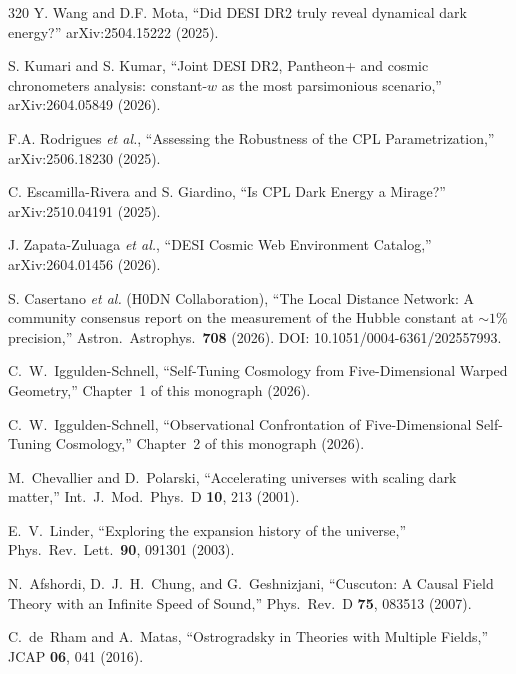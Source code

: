 \begin{thebibliography}{320}
Y. Wang and D.F. Mota,
``Did DESI DR2 truly reveal dynamical dark energy?''
arXiv:2504.15222 (2025).

S. Kumari and S. Kumar,
``Joint DESI DR2, Pantheon+ and cosmic chronometers analysis: constant-$w$ as the most parsimonious scenario,''
arXiv:2604.05849 (2026).

F.A. Rodrigues \textit{et al.},
``Assessing the Robustness of the CPL Parametrization,''
arXiv:2506.18230 (2025).

C. Escamilla-Rivera and S. Giardino,
``Is CPL Dark Energy a Mirage?''
arXiv:2510.04191 (2025).

J. Zapata-Zuluaga \textit{et al.},
``DESI Cosmic Web Environment Catalog,''
arXiv:2604.01456 (2026).

S. Casertano \textit{et al.} (H0DN Collaboration),
``The Local Distance Network: A community consensus report on the measurement of the Hubble constant at ${\sim}1\%$ precision,''
Astron.\ Astrophys.\ \textbf{708} (2026).
DOI: 10.1051/0004-6361/202557993.


C.~W.~Iggulden-Schnell,
``Self-Tuning Cosmology from Five-Dimensional Warped Geometry,''
Chapter~1 of this monograph (2026).

C.~W.~Iggulden-Schnell,
``Observational Confrontation of Five-Dimensional Self-Tuning Cosmology,''
Chapter~2 of this monograph (2026).

M.~Chevallier and D.~Polarski,
``Accelerating universes with scaling dark matter,''
Int.\ J.\ Mod.\ Phys.\ D \textbf{10}, 213 (2001).

E.~V.~Linder,
``Exploring the expansion history of the universe,''
Phys.\ Rev.\ Lett.\ \textbf{90}, 091301 (2003).

N.~Afshordi, D.~J.~H.~Chung, and G.~Geshnizjani,
``Cuscuton: A Causal Field Theory with an Infinite Speed of Sound,''
Phys.\ Rev.\ D \textbf{75}, 083513 (2007).

C.~de~Rham and A.~Matas,
``Ostrogradsky in Theories with Multiple Fields,''
JCAP \textbf{06}, 041 (2016).


\end{thebibliography}
